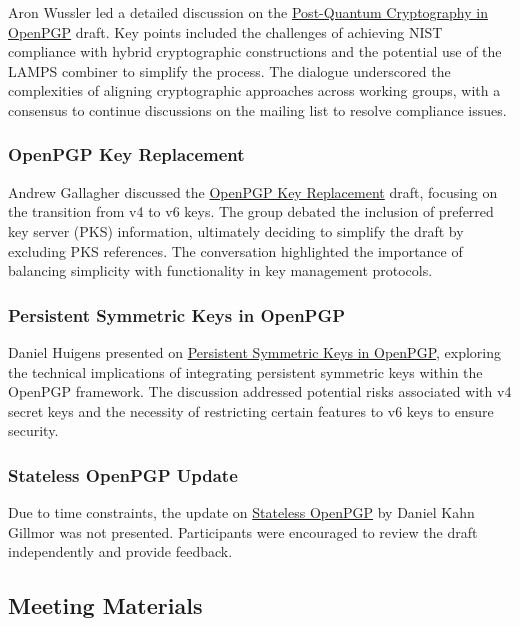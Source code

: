 \documentclass{article}
\begin{document}
Aron Wussler led a detailed discussion on the \href{https://datatracker.ietf.org/doc/draft-ietf-openpgp-pqc/}{Post-Quantum Cryptography in OpenPGP} draft. Key points included the challenges of achieving NIST compliance with hybrid cryptographic constructions and the potential use of the LAMPS combiner to simplify the process. The dialogue underscored the complexities of aligning cryptographic approaches across working groups, with a consensus to continue discussions on the mailing list to resolve compliance issues.

\subsubsection{OpenPGP Key Replacement}

Andrew Gallagher discussed the \href{https://datatracker.ietf.org/doc/draft-ietf-openpgp-replacementkey/}{OpenPGP Key Replacement} draft, focusing on the transition from v4 to v6 keys. The group debated the inclusion of preferred key server (PKS) information, ultimately deciding to simplify the draft by excluding PKS references. The conversation highlighted the importance of balancing simplicity with functionality in key management protocols.

\subsubsection{Persistent Symmetric Keys in OpenPGP}

Daniel Huigens presented on \href{https://datatracker.ietf.org/doc/draft-ietf-openpgp-persistent-symmetric-keys/}{Persistent Symmetric Keys in OpenPGP}, exploring the technical implications of integrating persistent symmetric keys within the OpenPGP framework. The discussion addressed potential risks associated with v4 secret keys and the necessity of restricting certain features to v6 keys to ensure security.

\subsubsection{Stateless OpenPGP Update}

Due to time constraints, the update on \href{https://datatracker.ietf.org/doc/draft-dkg-openpgp-stateless-cli}{Stateless OpenPGP} by Daniel Kahn Gillmor was not presented. Participants were encouraged to review the draft independently and provide feedback.

\subsection{Meeting Materials}
\end{document}
